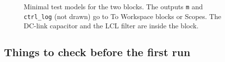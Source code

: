 \documentclass[11pt,a4paper]{scrartcl}
\newcommand{\code}[1]{\texttt{#1}}
\begin{document}
\begin{onehalfspace}
\begin{figure}[H]
	\captionsetup{width=0.88\textwidth, font=small}
	\caption[Minimal test models.]{Minimal test models for the two blocks. The outputs \code{m} and \code{ctrl\_log} (not drawn) go to To Workspace blocks or Scopes. The DC-link capacitor and the LCL filter are inside the block.}
	\label{fig:minimal}
\end{figure}

\subsection{Things to check before the first run}
\label{sec:checks}


\end{onehalfspace}
\end{document}
